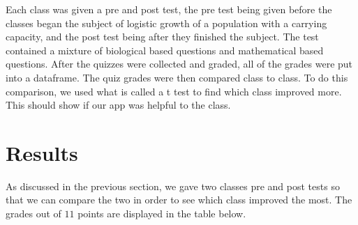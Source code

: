 \documentclass[titlepage]{article}\usepackage[]{graphicx}\usepackage[]{color}
\begin{document}
Each class was given a pre and post test, the pre test being given before the classes began the subject of logistic growth of a population with a carrying capacity, and the post test being after they finished the subject. The test contained a mixture of biological based questions and mathematical based questions. After the quizzes were collected and graded, all of the grades were put into a dataframe. The quiz grades were then compared class to class. To do this comparison, we used what is called a t test to find which class improved more. This should show if our app was helpful to the class.









\section{Results}



As discussed in the previous section, we gave two classes pre and post tests so that we can compare the two in order to see which class improved the most. The grades out of \(11\) points are displayed in the table below.

\bigskip
\bigskip
\end{document}
